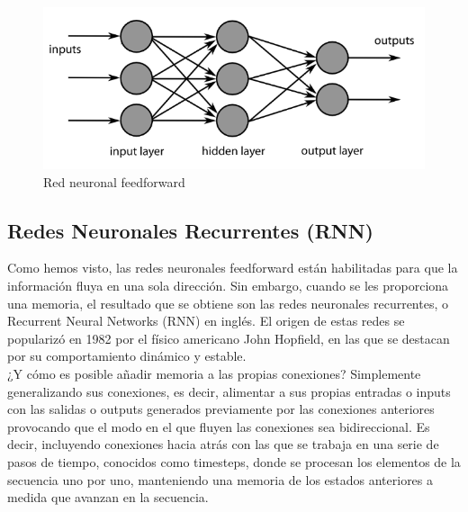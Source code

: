 \begin{figure}[h]
	\centering
	\includegraphics[width = 1 \textwidth]{Imagenes/Vectorial/feedforward.png}
	\caption{Red neuronal feedforward}
	\label{fig:feedforward}
\end{figure}



\subsection{Redes Neuronales Recurrentes (RNN)} 

Como hemos visto, las redes neuronales feedforward están habilitadas para que la información fluya en una sola dirección. Sin embargo, cuando se les proporciona una memoria, el resultado que se obtiene son las redes neuronales recurrentes, o Recurrent Neural Networks (RNN) en inglés. El origen de estas redes se popularizó en 1982 por el físico americano John Hopfield, en las que se destacan por su comportamiento dinámico y estable. \\

¿Y cómo es posible añadir memoria a las propias conexiones? Simplemente generalizando sus conexiones, es decir, alimentar a sus propias entradas o inputs con las salidas o outputs generados previamente por las conexiones anteriores provocando que el modo en el que fluyen las conexiones sea bidireccional. Es decir, incluyendo conexiones hacia atrás con las que se trabaja en una serie de pasos de tiempo, conocidos como timesteps, donde se procesan los elementos de la secuencia uno por uno, manteniendo una memoria de los estados anteriores a medida que avanzan en la secuencia.\\

